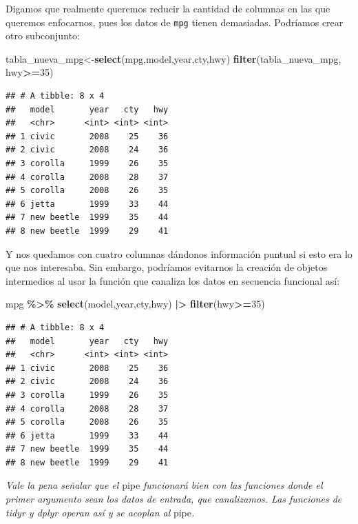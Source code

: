 \documentclass[
]{article}
\newenvironment{Shaded}{\begin{snugshade}}{\end{snugshade}}
\newcommand{\DecValTok}[1]{\textcolor[rgb]{0.00,0.00,0.81}{#1}}
\newcommand{\FunctionTok}[1]{\textcolor[rgb]{0.13,0.29,0.53}{\textbf{#1}}}
\newcommand{\NormalTok}[1]{#1}
\newcommand{\OtherTok}[1]{\textcolor[rgb]{0.56,0.35,0.01}{#1}}
\newcommand{\SpecialCharTok}[1]{\textcolor[rgb]{0.81,0.36,0.00}{\textbf{#1}}}
\begin{document}
Digamos que realmente queremos reducir la cantidad de columnas en las
que queremos enfocarnos, pues los datos de \texttt{mpg} tienen
demasiadas. Podríamos crear otro subconjunto:

\begin{Shaded}
\begin{Highlighting}[]
\NormalTok{tabla\_nueva\_mpg}\OtherTok{\textless{}{-}}\FunctionTok{select}\NormalTok{(mpg,model,year,cty,hwy)}
\FunctionTok{filter}\NormalTok{(tabla\_nueva\_mpg, hwy}\SpecialCharTok{\textgreater{}=}\DecValTok{35}\NormalTok{) }
\end{Highlighting}
\end{Shaded}

\begin{verbatim}
## # A tibble: 8 x 4
##   model       year   cty   hwy
##   <chr>      <int> <int> <int>
## 1 civic       2008    25    36
## 2 civic       2008    24    36
## 3 corolla     1999    26    35
## 4 corolla     2008    28    37
## 5 corolla     2008    26    35
## 6 jetta       1999    33    44
## 7 new beetle  1999    35    44
## 8 new beetle  1999    29    41
\end{verbatim}

Y nos quedamos con cuatro columnas dándonos información puntual si esto
era lo que nos interesaba. Sin embargo, podríamos evitarnos la creación
de objetos intermedios al usar la función que canaliza los datos en
secuencia funcional así:

\begin{Shaded}
\begin{Highlighting}[]
\NormalTok{mpg }\SpecialCharTok{\%\textgreater{}\%} \FunctionTok{select}\NormalTok{(model,year,cty,hwy) }\SpecialCharTok{|\textgreater{}} \FunctionTok{filter}\NormalTok{(hwy}\SpecialCharTok{\textgreater{}=}\DecValTok{35}\NormalTok{)}
\end{Highlighting}
\end{Shaded}

\begin{verbatim}
## # A tibble: 8 x 4
##   model       year   cty   hwy
##   <chr>      <int> <int> <int>
## 1 civic       2008    25    36
## 2 civic       2008    24    36
## 3 corolla     1999    26    35
## 4 corolla     2008    28    37
## 5 corolla     2008    26    35
## 6 jetta       1999    33    44
## 7 new beetle  1999    35    44
## 8 new beetle  1999    29    41
\end{verbatim}

\emph{Vale la pena señalar que el} pipe \emph{funcionará bien con las
funciones donde el primer argumento sean los datos de entrada, que
canalizamos. Las funciones de tidyr y dplyr operan así y se acoplan al}
pipe\emph{.}
\end{document}
